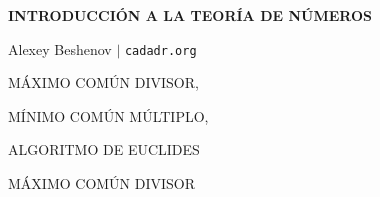 



\begin{frame}
  \textbf{INTRODUCCIÓN A LA TEORÍA DE NÚMEROS}

  Alexey Beshenov $\mid$ \texttt{cadadr.org}

  \vfill

  \begin{center}\huge\headingfont
    MÁXIMO COMÚN DIVISOR,

    \vspace{0.5em}

    MÍNIMO COMÚN MÚLTIPLO,

    \vspace{0.5em}

    ALGORITMO DE EUCLIDES
  \end{center}

  \vfill
\end{frame}

\begin{frame}
  \vfill

  \begin{center}\huge\headingfont
    MÁXIMO COMÚN DIVISOR
  \end{center}

  \vfill
\end{frame}

